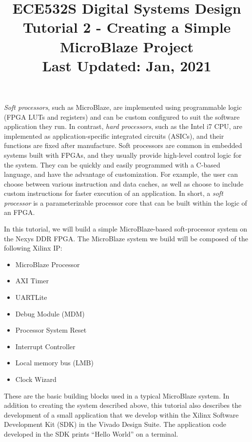 \documentclass[11pt]{article}
\title{ECE532S Digital Systems Design \\ \vspace{0.4cm}
       \Large Tutorial 2 - Creating a Simple MicroBlaze Project \\ \vspace{0.4cm}
       \small Last Updated: Jan, 2021}
\author{ }
\date{ }
\begin{document}
\maketitle
\vspace{-1cm}

\textit{Soft processors}, such as MicroBlaze, are implemented using programmable logic (FPGA LUTs and registers) and can be custom configured to suit the software application they run. In contrast, \textit{hard processors}, such as the Intel i7 CPU, are implemented as application-specific integrated circuits (ASICs), and their functions are fixed after manufacture. Soft processors are common in embedded systems built with FPGAs, and they usually provide high-level control logic for the system. They can be quickly and easily programmed with a C-based language, and have the advantage of customization. For example, the user can choose between various instruction and data caches, as well as choose to include custom instructions for faster execution of an application. In short, a \textit{soft processor} is a parameterizable processor core that can be built within the logic of an FPGA. 

In this tutorial, we will build a simple MicroBlaze-based soft-processor system on the Nexys DDR FPGA. The MicroBlaze system we build will be composed of the following Xilinx IP:

\begin{multicols}{2}
\begin{itemize}
    \item MicroBlaze Processor
    \item AXI Timer
    \item UARTLite
    \item Debug Module (MDM)
    \item Processor System Reset
    \item Interrupt Controller
    \item Local memory bus (LMB)
    \item Clock Wizard
\end{itemize}
\end{multicols}

\noindent
These are the basic building blocks used in a typical MicroBlaze system. In addition to creating the system described above, this tutorial also describes the development of a small application that we develop within the Xilinx Software Development Kit (SDK) in the Vivado Design Suite. The application code developed in the SDK prints “Hello World” on a terminal.
\end{document}
